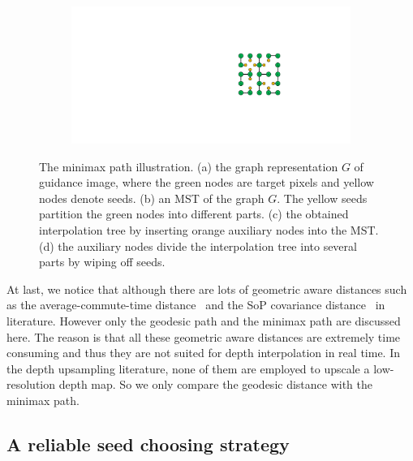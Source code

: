 \documentclass[preprint,10pt,5p,times,twocolumn]{elsarticle}
\begin{document}
\begin{figure}[t]
\begin{subfigure}[b]{0.2\linewidth}
    \caption{}
    \label{fig:minimax_path:interpolation_tree_3}
\end{subfigure}\hfill
\begin{subfigure}[b]{0.2\linewidth}
    \centering
    \includegraphics[width=\linewidth]{interpolation_tree_4.pdf}
    \caption{}
    \label{fig:minimax_path:interpolation_tree_4}
\end{subfigure}
\caption{The minimax path illustration. (a) the graph representation $G$ of guidance image, where the green nodes are target pixels and yellow nodes denote seeds. (b) an MST of the graph $G$. The yellow seeds partition the green nodes into different parts. (c) the obtained interpolation tree by inserting orange auxiliary nodes into the MST. (d) the auxiliary nodes divide the interpolation tree into several parts by wiping off seeds.}
\label{fig:minimax_path}
\end{figure}


At last, we notice that although there are lots of geometric aware distances such as the average-commute-time distance~\cite{Fouss2007} and the SoP covariance distance~\cite{Mantrach2010} in literature. However only the geodesic path and the minimax path are  discussed here. The reason is that all these geometric aware distances are extremely time consuming and thus they are not suited for depth interpolation in real time. In the depth upsampling literature, none of them are employed to upscale a low-resolution depth map. So we only compare the geodesic distance with the minimax path.




\subsection{A reliable seed choosing strategy}
\end{document}
